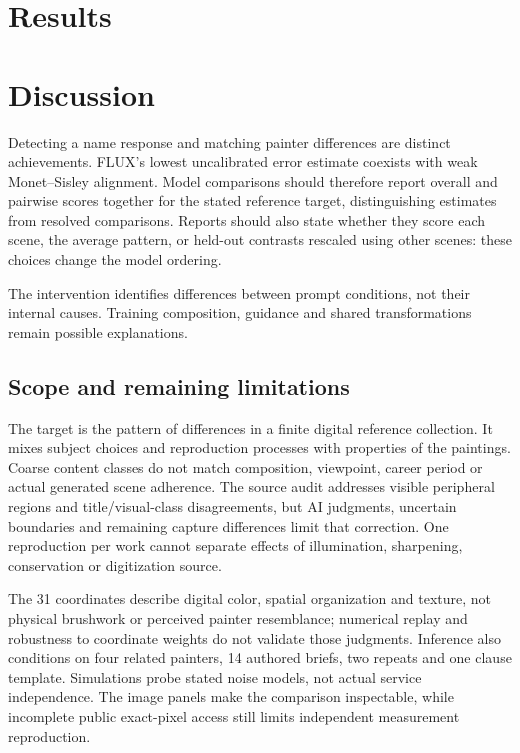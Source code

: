\documentclass[11pt]{article}
\begin{document}
\section{Results}\label{sec:results}


\section{Discussion}\label{sec:discussion}
Detecting a name response and matching painter differences are distinct achievements.
FLUX's lowest uncalibrated error estimate coexists with weak Monet--Sisley alignment.
Model comparisons should therefore report overall and pairwise scores together
for the stated reference target, distinguishing estimates from resolved comparisons.
Reports should also state whether they score each scene, the average pattern,
or held-out contrasts rescaled using other scenes: these choices change the model ordering.

The intervention identifies differences between prompt conditions, not their
internal causes. Training composition, guidance and shared transformations remain
possible explanations.

\subsection{Scope and remaining limitations}
The target is the pattern of differences in a finite digital reference
collection. It mixes subject choices and reproduction processes with properties
of the paintings. Coarse content classes do not match composition, viewpoint,
career period or actual generated scene adherence. The source audit addresses
visible peripheral regions and title/visual-class disagreements, but AI
judgments, uncertain boundaries and remaining capture differences limit that
correction. One reproduction per work cannot separate effects of illumination,
sharpening, conservation or digitization source.

The 31 coordinates describe digital color, spatial organization and texture,
not physical brushwork or perceived painter resemblance; numerical replay and
robustness to coordinate weights do not validate those judgments.
Inference also conditions on four related
painters, 14 authored briefs, two repeats and one clause template. Simulations
probe stated noise models, not actual service independence. The image panels
make the comparison inspectable, while incomplete public exact-pixel access
still limits independent measurement reproduction.
\end{document}
